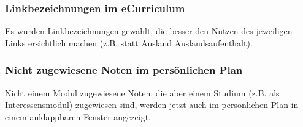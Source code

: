 \documentclass[a4paper,10pt]{scrartcl}
\begin{document}
\subsubsection*{Linkbezeichnungen im eCurriculum}

Es wurden Linkbezeichnungen gewählt, die besser den Nutzen des jeweiligen Links ersichtlich machen (z.B. statt Ausland Auslandsaufenthalt).

\noindent{}
\medskip

\subsubsection*{Nicht zugewiesene Noten im persönlichen Plan}

Nicht einem Modul zugewiesene Noten, die aber einem Studium (z.B. als Interessensmodul) zugewiesen sind, werden jetzt auch im persönlichen Plan in einem auklappbaren Fenster angezeigt.

\noindent{}
\medskip
\end{document}
